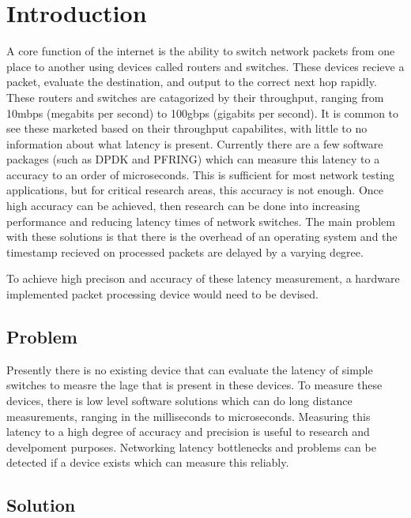 \chapter{Introduction}\label{C:intro}

\par A core function of the internet is the ability to switch network packets from one place to another using devices called routers and switches.
These devices recieve a packet, evaluate the destination, and output to the correct next hop rapidly.
These routers and switches are catagorized by their throughput, ranging from 10mbps (megabits per second) to 100gbps (gigabits per second).
It is common to see these marketed based on their throughput capabilites, with little to no information about what latency is present.
Currently there are a few software packages (such as DPDK and PF\textunderscore RING) which can measure this latency to a accuracy to an order of microseconds.
This is sufficient for most network testing applications, but for critical research areas, this accuracy is not enough.
Once high accuracy can be achieved, then research can be done into increasing performance and reducing latency times of network switches.
The main problem with these solutions is that there is the overhead of an operating system and the timestamp recieved on processed packets are delayed by a varying degree.

\par To achieve high precison and accuracy of these latency measurement, a hardware implemented packet processing device would need to be devised.

\section{Problem}

\par Presently there is no existing device that can evaluate the latency of simple switches to measre the lage that is present in these devices.
To measure these devices, there is low level software solutions which can do long distance measurements, ranging in the milliseconds to microseconds.
Measuring this latency to a high degree of accuracy and precision is useful to research and develpoment purposes.
Networking latency bottlenecks and problems can be detected if a device exists which can measure this reliably.

\section{Solution}

